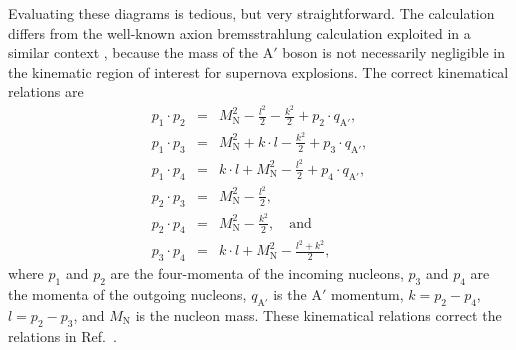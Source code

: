 \documentclass[nofootinbib,prd,superscriptaddress,twocolumn]{revtex4}
\newcommand{\bea}{\begin{eqnarray}}
\newcommand{\eea}{\end{eqnarray}}
\newcommand{\qa}{q_{\mathrm{A}'}}
\newcommand{\Aprime}{\mathrm{A}'}
\begin{document}
	
Evaluating these diagrams is tedious, but very straightforward. The calculation differs 
from the well-known axion bremsstrahlung calculation exploited in a similar context \cite{raffelt96_book}, 
because the mass of the $\Aprime$ boson is not necessarily negligible in the kinematic 
region of interest for supernova explosions. The correct kinematical relations are 
%
\bea 
p_1 \cdot p_2 &=& M_{\mathrm N}^2 - \frac{l^2}{2} - \frac{k^2}{2} + p_2 \cdot \qa,\\
p_1 \cdot p_3 &=& M_{\mathrm N}^2 + k \cdot l - \frac{k^2}{2} + p_3 \cdot \qa,\\  
p_1 \cdot p_4 &=& k \cdot l + M_{\mathrm N}^2 - \frac{l^2}{2} + p_4 \cdot \qa, \\
p_2 \cdot p_3 &=& M_{\mathrm N}^2 - \frac{l^2}{2}, \\ 
p_2 \cdot p_4 &=& M_{\mathrm N}^2 - \frac{k^2}{2},\quad \mathrm{and}\\
p_3 \cdot p_4 &=& k \cdot l + M_{\mathrm N}^2 - \frac{l^2 + k^2}{2},
\eea
%
where $p_1$ and $p_2$ are the four-momenta of the incoming nucleons, $p_3$ and $p_4$ are the momenta 
of the outgoing nucleons, $\qa$ is the $\Aprime$ momentum, $k=p_2 - p_4$, $l=p_2 - p_3$, and $M_{\mathrm{N}}$ 
is the nucleon mass. These kinematical relations correct the relations in Ref.~\cite{dent_etal12}.
\end{document}
